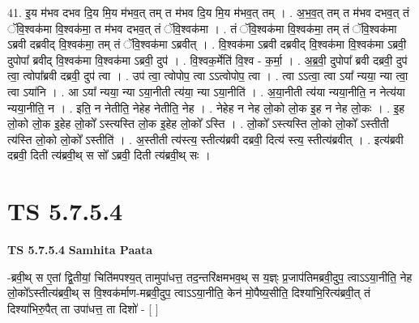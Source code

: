 \documentclass[17pt]{extarticle}
\begin{document}
41. इ॒य म॑भव दभव दि॒य मि॒य म॑भव॒त् तम् त म॑भव दि॒य मि॒य म॑भव॒त् तम् । . अ॒भ॒व॒त् तम् त म॑भव दभव॒त् तं ॅवि॒श्वक॑मा वि॒श्वक॑मा॒ त म॑भव दभव॒त् तं ॅवि॒श्वक॑मा । . तं ॅवि॒श्वक॑मा वि॒श्वक॑मा॒ तम् तं ॅवि॒श्वक॑मा ऽब्रवी दब्रवीद् वि॒श्वक॑मा॒ तम् तं ॅवि॒श्वक॑मा ऽब्रवीत् । . वि॒श्वक॑मा ऽब्रवी दब्रवीद् वि॒श्वक॑मा वि॒श्वक॑मा ऽब्रवी॒ दुपोपा᳚ ब्रवीद् वि॒श्वक॑मा वि॒श्वक॑मा ऽब्रवी॒ दुप॑ । . वि॒श्वक॒र्मेति॑ वि॒श्व - क॒र्मा॒ । . अ॒ब्र॒वी॒ दुपोपा᳚ ब्रवी दब्रवी॒ दुप॑ त्वा॒ त्वोपा᳚ब्रवी दब्रवी॒ दुप॑ त्वा । . उप॑ त्वा॒ त्वोपोप॒ त्वा ऽऽत्वोपोप॒ त्वा । . त्वा ऽऽत्वा॒ त्वा ऽया᳚ न्यया॒ न्या त्वा॒ त्वा ऽया॑नि । . आ ऽया᳚ न्यया॒ न्या ऽया॒नीती त्य॑या॒ न्या ऽया॒नीति॑ । . अ॒या॒नीती त्य॑या न्यया॒नीति॒ न नेत्य॑या न्यया॒नीति॒ न । . इति॒ न नेतीति॒ नेहेह नेतीति॒ नेह । . नेहेह न नेह लो॒को लो॒क इ॒ह न नेह लो॒कः । . इ॒ह लो॒को लो॒क इ॒हेह लो॒को᳚ ऽस्त्यस्ति लो॒क इ॒हेह लो॒को᳚ ऽस्ति । . लो॒को᳚ ऽस्त्यस्ति लो॒को लो॒को᳚ ऽस्तीती त्य॑स्ति लो॒को लो॒को᳚ ऽस्तीति॑ । . अ॒स्तीती त्य॑स्त्य॒ स्तीत्य॑ब्रवी दब्रवी॒ दित्य॑ स्त्य॒ स्तीत्य॑ब्रवीत् । . इत्य॑ब्रवी दब्रवी॒ दिती त्य॑ब्रवी॒थ् स सो᳚ ऽब्रवी॒ दिती त्य॑ब्रवी॒थ् सः । \newline
\pagebreak
{}

\section{ TS 5.7.5.4 }

\textbf{TS 5.7.5.4 } \newline
\textbf{Samhita Paata} \newline

-ब्रवी॒थ् स ए॒तां द्वि॒तीयां॒ चिति॑मपश्य॒त् तामुपा॑धत्त॒ तद॒न्तरि॑क्षमभव॒थ् स य॒ज्ञ्ः प्र॒जाप॑तिमब्रवी॒दुप॒ त्वाऽऽया॒नीति॒ नेह लो॒को᳚ऽस्तीत्य॑ब्रवी॒थ् स वि॒श्वक॑र्माण-मब्रवी॒दुप॒ त्वाऽऽया॒नीति॒ केन॑ मो॒पैष्य॒सीति॒ दिश्या॑भि॒रित्य॑ब्रवी॒त् तं दिश्या॑भिरु॒पैत् ता उपा॑धत्त॒ ता दिशो॑ - [  ] \newline
\end{document}
